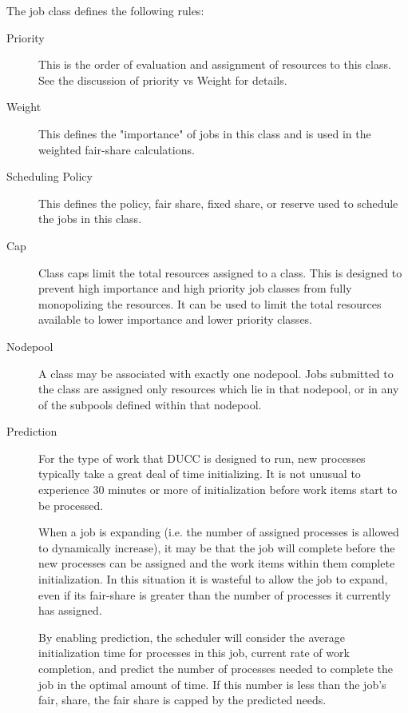     The job class defines the following rules: 
    
    \begin{description}
        \item[Priority] This is the order of evaluation and assignment of resources to this class. See
          the discussion of priority vs Weight for details. 

        \item[Weight] This defines the "importance" of jobs in this class and is used in the weighted
          fair-share calculations. 

        \item[Scheduling Policy] This defines the policy, fair share, fixed share, or reserve used to
          schedule the jobs in this class.

        \item[Cap] Class caps limit the total resources assigned to a class. This is designed to prevent
          high importance and high priority job classes from fully monopolizing the resources. It can be
          used to limit the total resources available to lower importance and lower priority classes.

        \item[Nodepool] A class may be associated with exactly one nodepool. Jobs submitted to the class
          are assigned only resources which lie in that nodepool, or in any of the subpools defined
          within that nodepool.

        \item[Prediction] For the type of work that DUCC is designed to run, new processes typically take
          a great deal of time initializing. It is not unusual to experience 30 minutes or more of
          initialization before work items start to be processed.

          When a job is expanding (i.e. the number of assigned processes is allowed to dynamically 
          increase), it may be that the job will complete before the new processes can be assigned and 
          the work items within them complete initialization. In this situation it is wasteful to allow the 
          job to expand, even if its fair-share is greater than the number of processes it currently has 
          assigned. 
          
          By enabling prediction, the scheduler will consider the average initialization time for processes 
          in this job, current rate of work completion, and predict the number of processes needed to 
          complete the job in the optimal amount of time. If this number is less than the job's fair, share, 
          the fair share is capped by the predicted needs. 
          

\end{description}
